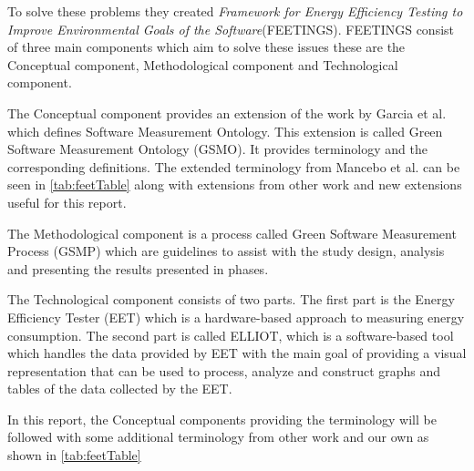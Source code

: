 To solve these problems they created \textit{Framework for Energy Efficiency Testing to Improve Environmental Goals of the Software}(FEETINGS). FEETINGS consist of three main components which aim to solve these issues these are the Conceptual component, Methodological component and Technological component.\nytafsnit

The Conceptual component provides an extension of the work by Garcia et al. which defines Software Measurement Ontology\cite{GARCIA2006631}. This extension is called Green Software Measurement Ontology (GSMO). It provides terminology and the corresponding definitions. The extended terminology from Mancebo et al. can be seen in \cref{tab:feetTable} along with extensions from other work and new extensions useful for this report.



The Methodological component is a process called Green Software Measurement Process (GSMP) which are guidelines to assist with the study design, analysis and presenting the results presented in phases.

The Technological component consists of two parts. The first part is the Energy Efficiency Tester (EET) which is a hardware-based approach to measuring energy consumption. The second part is called ELLIOT, which is a software-based tool which handles the data provided by EET with the main goal of providing a visual representation that can be used to process, analyze and construct graphs and tables of the data collected by the EET.

In this report, the Conceptual components providing the terminology will be followed with some additional terminology from other work and our own as shown in \cref{tab:feetTable}


